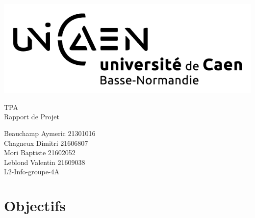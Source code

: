 \documentclass[a4paper,12pt]{article} %
\begin{document}




\begin{titlepage}

\includegraphics[scale=0.3]{images/unicaen.png}

\vspace{7cm}

\begin{center}

\begin{Huge}
TPA\\
Rapport de Projet\\
\end{Huge}
\vspace{2cm}
\begin{large}
Beauchamp Aymeric 21301016\\
Chagneux Dimitri 21606807\\
Mori Baptiste 21602052\\
Leblond Valentin 21609038\\
\vspace{1cm}
L2-Info-groupe-4A
\end{large}

\end{center}
\end{titlepage}



\newpage

\tableofcontents

\newpage



\section*{Objectifs}
\end{document}
